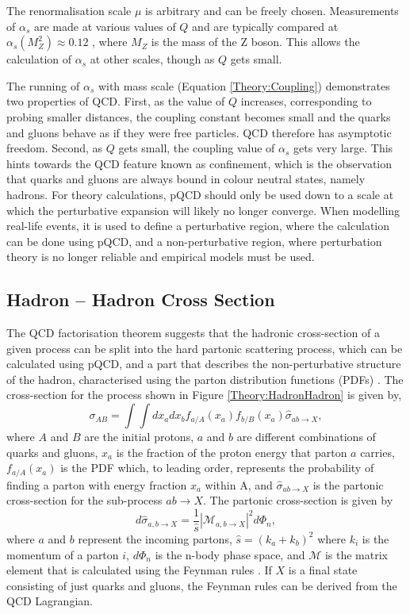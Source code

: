 The renormalisation scale $\mu$ is arbitrary and can be freely chosen.
Measurements of $\alpha_s$ are made at various values of $Q$ and are typically compared at $\alpha_s(M_{Z}^{2})\approx0.12$ \cite{ref:Webber}, where $M_Z$ is the mass of the Z boson.
This allows the calculation of $\alpha_s$ at other scales, though as $Q$ gets small. 

The running of $\alpha_s$ with mass scale (Equation \ref{Theory:Coupling}) demonstrates two properties of QCD.
First, as the value of $Q$ increases, corresponding to probing smaller distances, the coupling constant becomes small and the quarks and gluons behave as if they were free particles.
QCD therefore has asymptotic freedom.
Second, as $Q$ gets small, the coupling value of  $\alpha_s$ gets very large.
This hints towards the QCD feature known as confinement, which is the observation that quarks and gluons are always bound in colour neutral states, namely hadrons.
For theory calculations, pQCD should only be used down to a scale at which the perturbative expansion will likely no longer converge.
When modelling real-life events, it is used to define a perturbative region, where the calculation can be done using pQCD, and a non-perturbative region, where perturbation theory is no longer reliable and empirical models must be used. 


\subsection{Hadron -- Hadron Cross Section}

The QCD factorisation theorem suggests that the hadronic cross-section of a given process can be split into the hard partonic scattering process, which can be calculated using pQCD, and a part that describes the non-perturbative structure of the hadron, characterised using the parton distribution functions (PDFs) \cite{ref:HardInt}.
The cross-section for the process shown in Figure \ref{Theory:HadronHadron} is given by,
\begin{equation}
\sigma_{AB}=\int\int dx_a dx_b f_{a/A}(x_a) f_{b/B}(x_a) \hat{\sigma}_{ab\rightarrow X},
\label{Theory:XSec}
\end{equation}
where $A$ and $B$ are the initial protons, $a$ and $b$ are different combinations of quarks and gluons, $x_a$ is the fraction of the proton energy that parton $a$ carries, $ f_{a/A}(x_a)$ is the PDF which, to leading order, represents the probability of finding a parton with energy fraction  $x_a$ within A, and $\hat{\sigma}_{ab\rightarrow X}$ is the partonic cross-section for the sub-process $ab\rightarrow X$.
The partonic cross-section is given by
\begin{equation}
d \hat{\sigma}_{a,b\rightarrow X}= \frac{1}{\hat{s}}|\mathcal{M}_{a,b\rightarrow X}|^{2} d\Phi_n,
\label{Theory:PartonCrossSection}
\end{equation}
where $a$ and $b$ represent the incoming partons, $\hat{s}= (k_a + k_b)^2$ where $k_i$ is the momentum of a parton $i$, $d\Phi_n$ is the n-body phase space, and $\mathcal{M}$ is the matrix element that is calculated using the Feynman rules \cite{ref:Webber}.
If $X$ is a final state consisting of just quarks and gluons, the Feynman rules can be derived from the QCD Lagrangian. 

